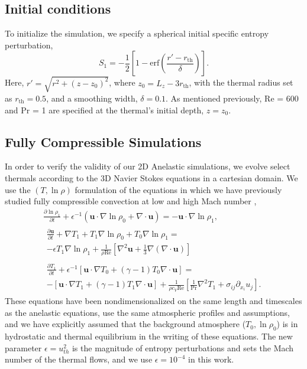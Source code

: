 \documentclass[twocolumn, amsmath, amsfonts, amssymb, trackchanges]{aastex62}
\newcommand{\DivU}{\ensuremath{\nabla\cdot\bm{u}}}
\newcommand{\grad}{\ensuremath{\nabla}}
\begin{document}
\subsection{Initial conditions}
To initialize the simulation, we specify a spherical initial specific entropy perturbation,
\begin{equation}
S_1 = - \frac{1}{2}\left[1 - \text{erf}\left(\frac{r' - r_{\text{th}}}{\delta}\right)\right].
\label{eqn:thermal_IC}
\end{equation}
Here, $r' = \sqrt{r^2 + (z - z_0)^2}$, where $z_0 = L_z - 3r_{\text{th}}$, with the thermal radius set as $r_{\text{th}} = 0.5$, and a smoothing width, $\delta = 0.1$.
As mentioned previously, Re = 600 and Pr = 1 are specified at the thermal's initial depth, $z = z_0$.

\subsection{Fully Compressible Simulations}
In order to verify the validity of our 2D Anelastic simulations, we evolve select thermals according to the 3D Navier Stokes equations in a cartesian domain. 
We use the $(T, \ln\rho)$ formulation of the equations in which we have previously studied fully compressible convection at low and high Mach number \citep{lecoanet&all2014, anders&brown2017},
\begin{gather}
\frac{\partial \ln\rho_1}{\partial t} + \epsilon^{-1}\left(\bm{u}\cdot\grad\ln\rho_0 + \DivU\right) = -\bm{u}\cdot\grad\ln\rho_1, \\
\begin{split}
\frac{\partial \bm{u}}{\partial t}  +\grad T_1 + T_1\grad\ln\rho_0 + T_0\grad\ln\rho_1  =\\
- \epsilon T_1\grad\ln\rho_1 + \frac{1}{\rho\text{Re}}\left[\grad^2\bm{u} + \frac{1}{3}\grad(\DivU)\right]
\end{split} \\
\begin{split}
\frac{\partial T_1}{\partial t} + \epsilon^{-1}\left[\bm{u}\cdot\grad T_0 + (\gamma-1)T_0\DivU\right] = \\
-\left[\bm{u}\cdot\grad T_1 + (\gamma-1)T_1\DivU\right] + \frac{1}{\rho c_V\text{Re}}\left[\frac{1}{\text{Pr}}\grad^2 T_1 + \sigma_{ij}\partial_{x_i}u_j\right].
\end{split}
\end{gather}
These equations have been nondimensionalized on the same length and timescales as the anelastic equations, use the same atmospheric profiles and assumptions, and we have explicitly assumed that the background atmosphere ($T_0, \ln\rho_0$) is in hydrostatic and thermal equilibrium in the writing of these equations. 
The new parameter $\epsilon = u_{th}^2$ is the magnitude of entropy perturbations and sets the Mach number of the thermal flows, and we use $\epsilon = 10^{-4}$ in this work. 
\end{document}
